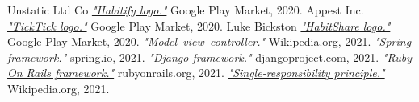 \documentclass[twoside]{ctuthesis}
\begin{document}
\begin{thebibliography}{99}
            Unstatic Ltd Co
            \href{https://play.google.com/store/apps/details?id=co.unstatic.habitify}{\emph{"Habitify logo."}}
            Google Play Market, 2020.
            Appest Inc.
            \href{https://play.google.com/store/apps/details?id=com.ticktick.task}{\emph{"TickTick logo."}}
            Google Play Market, 2020.
        Luke Bickston
        \href{https://play.google.com/store/apps/details?id=com.habitshareapp}{\emph{"HabitShare logo."}}
        Google Play Market, 2020.
        \href{https://en.wikipedia.org/wiki/Model\%E2\%80\%93view\%E2\%80\%93controller}{\emph{"Model–view–controller."}}
        Wikipedia.org, 2021.
        \href{https://spring.io/}{\emph{"Spring framework."}}
        spring.io, 2021.
        \href{https://www.djangoproject.com/}{\emph{"Django framework."}}
        djangoproject.com, 2021.
        \href{https://spring.io/}{\emph{"Ruby On Rails framework."}}
        rubyonrails.org, 2021.
        \href{https://en.wikipedia.org/wiki/Single-responsibility_principle}{\emph{"Single-responsibility principle."}}
        Wikipedia.org, 2021.

    \end{thebibliography}
\end{document}
